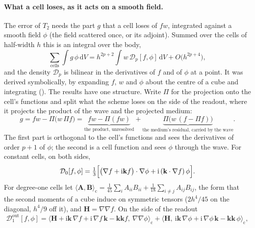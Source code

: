 \documentclass[11pt,a4paper]{article}
\newcommand{\bk}{\mathbf{k}}
\newcommand{\dd}{\mathrm{d}}
\begin{document}
\paragraph{What a cell loses, as it acts on a smooth field.} The error of $T_2$ needs the part $g$ that a
cell loses of $fw$, integrated against a smooth field $\phi$ (the field scattered once, or its adjoint).
Summed over the cells of half-width $h$ this is an integral over the body,
\begin{equation}\label{eq:lostdensity}
  \sum_{\text{cells}}\int g\,\phi\,\dd V=h^{2p+2}\int w\,\mathcal{D}_p[f,\phi]\,\dd V+O\bigl(h^{2p+4}\bigr),
\end{equation}
and the density $\mathcal{D}_p$ is bilinear in the derivatives of $f$ and of $\phi$ at a point. It was
derived symbolically, by expanding $f$, $w$ and $\phi$ about the centre of a cube and integrating
(). The results have one structure. Write $\Pi$ for the
projection onto the cell's functions and split what the scheme loses on the side of the readout, where
it projects the product of the wave and the projected medium:
\begin{equation}\label{eq:lostsplit}
  g=fw-\Pi\bigl(w\,\Pi f\bigr)=\underbrace{fw-\Pi(fw)}_{\text{the product, unresolved}}
  +\underbrace{\Pi\bigl(w\,(f-\Pi f)\bigr)}_{\text{the medium's residual, carried by the wave}} .
\end{equation}
The first part is orthogonal to the cell's functions and sees the derivatives of order $p+1$ of $\phi$;
the second is a cell function and sees $\phi$ through the wave. For constant cells, on both sides,
\begin{equation}\label{eq:D0}
  \mathcal{D}_0[f,\phi]=\tfrac13\Bigl[\bigl(\nabla f+\mathrm{i}\bk f\bigr)\cdot\nabla\phi
  +\mathrm{i}\,(\bk\cdot\nabla f)\,\phi\Bigr].
\end{equation}
For degree-one cells let $\langle\mathbf{A},\mathbf{B}\rangle_{\mathrm{c}}=\tfrac1{45}\sum_iA_{ii}B_{ii}
+\tfrac1{18}\sum_{i\ne j}A_{ij}B_{ij}$, the form that the second moments of a cube induce on symmetric
tensors ($2h^4/45$ on the diagonal, $h^4/9$ off it), and $\mathbf{H}=\nabla\nabla f$. On the side of the
readout
\begin{equation}\label{eq:D1out}
  \mathcal{D}_1^{\mathrm{out}}[f,\phi]
  =\bigl\langle\mathbf{H}+\mathrm{i}\bk\,\nabla f+\mathrm{i}\,\nabla f\,\bk-\bk\bk f,\ \nabla\nabla\phi\bigr\rangle_{\mathrm{c}}
  +\bigl\langle\mathbf{H},\ \mathrm{i}\bk\,\nabla\phi+\mathrm{i}\,\nabla\phi\,\bk-\bk\bk\,\phi\bigr\rangle_{\mathrm{c}} ,
\end{equation}
\end{document}

